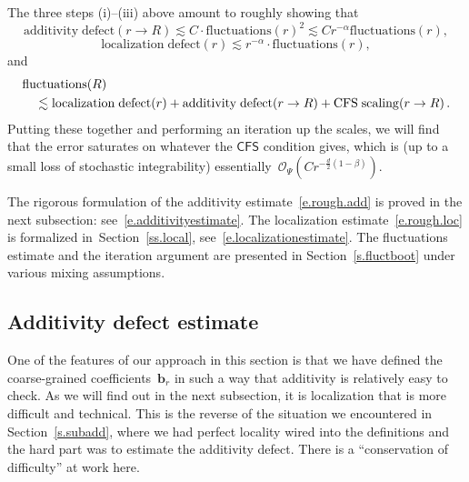 \documentclass[11pt]{article} %
\numberwithin{equation}{section}
\theoremstyle{definition}
\renewcommand{\b}{\ensuremath{\mathbf{b}}}
\renewcommand{\O}{\mathcal{O}}
\newcommand{\CFS}{\mathsf{CFS}}
\begin{document}
\smallskip

The three steps (i)--(iii) above amount to roughly showing that 
\begin{equation}
\label{e.rough.add}
\mathrm{additivity \; defect}(r\to R)
\lesssim
C\cdot \mathrm{fluctuations}(r)^2
\lesssim C r^{-\alpha} \mathrm{fluctuations}(r),
\end{equation}
\begin{equation}
\label{e.rough.loc}
\mathrm{localization \; defect} (r)
\lesssim
r^{-\alpha} \cdot \mathrm{fluctuations}(r),
\end{equation}
and
\begin{align}
\lefteqn{ \mathrm{fluctuations}(R) } \quad & 
\notag \\ & 
\lesssim
\mathrm{localization \; defect} (r)
+
\mathrm{additivity \; defect}(r\to R)
+ 
\mathrm{CFS \; scaling}(r\to R)\,.
\end{align}
Putting these together and performing an iteration up the scales, we will find that the error saturates on whatever the $\CFS$ condition gives, which is (up to a small loss of stochastic integrability) essentially~$\O_\Psi(Cr^{-\frac d2(1-\beta)})$.

\smallskip

The rigorous formulation of the additivity estimate~\eqref{e.rough.add}
is proved in the next subsection: see~\eqref{e.additivityestimate}. 
The localization estimate~\eqref{e.rough.loc} is formalized in~Section~\ref{ss.local}, see~\eqref{e.localizationestimate}. 
The fluctuations estimate and the iteration argument are presented in Section~\ref{s.fluctboot} under various mixing assumptions. 




\subsection{Additivity defect estimate}

One of the features of our approach in this section is that we have defined the coarse-grained coefficients~$\b_r$ in such a way that additivity is relatively easy to check. As we will find out in the next subsection, it is localization that is more difficult and technical. This is the reverse of the situation we encountered in Section~\ref{s.subadd}, where we had perfect locality wired into the definitions and the hard part was to estimate the additivity defect. 
There is a ``conservation of difficulty'' at work here. 

\smallskip
\end{document}
